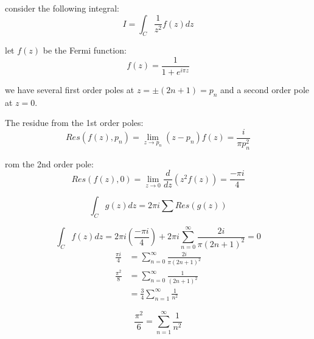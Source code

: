 consider the following integral:
\begin{equation}
I = \int_C \frac{1}{z^2} f(z) dz
\end{equation}

let $f(z) $ be the Fermi function:
\begin{equation}
f(z) = \frac{1}{1+ e^{i\pi z}}
\end{equation}

we have several first order poles at $z=\pm (2n + 1 ) =p_n$ and a second order pole at $z=0$.

The residue from the 1st order poles:
\begin{equation}
Res(f(z),p_n) = \lim_{z\rightarrow p_n} (z-p_n) f(z) = \frac{
i}{\pi p_n^2}
\end{equation}

rom the 2nd order pole:
\begin{equation}
Res(f(z),0) = \lim_{z\rightarrow 0} \frac{d}{dz} (z^2 f(z)) = \frac{-\pi i}{4}
\end{equation}

\begin{equation}
\int_C g(z) dz = 2\pi i \sum Res(g(z))
\end{equation}

\begin{equation}
\int_C f(z) dz = 2 \pi i \left(  \frac{
-\pi i}{4} \right) + 2 \pi i \sum_{n=0}^\infty \frac{2i}{\pi (2n+1)^2} = 0
\end{equation}
\begin{align}
\frac{\pi i }{4} &= \sum_{n=0}^\infty \frac{2i}{\pi (2n+1)^2} \\
\frac{\pi^2}{8} &= \sum_{n=0}^\infty \frac{1}{(2n+1)^2}\\
&= \frac{3}{4}\sum_{n=1}^\infty \frac{1}{n^2}
\end{align}

\begin{equation}
\frac{\pi^2}{6} = \sum_{n=1}^\infty \frac{1}{n^2}
\end{equation}